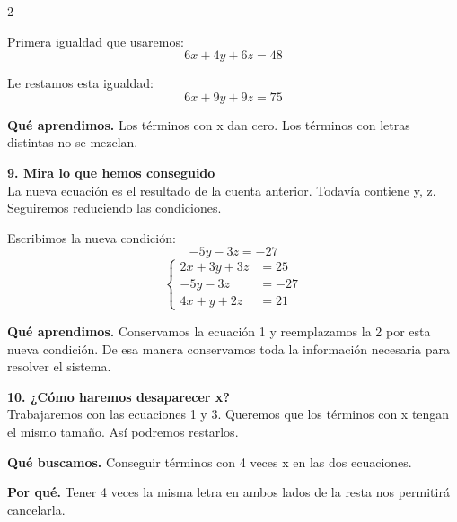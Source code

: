 \documentclass[11pt,a4paper,landscape]{article}
\begin{document}
\begin{multicols*}{2}
\begin{minipage}{\linewidth}
\par\smallskip Primera igualdad que usaremos:
\[6x + 4y + 6z = 48\]
\par\smallskip Le restamos esta igualdad:
\[6x + 9y + 9z = 75\]
\par\smallskip\textbf{Qué aprendimos.} Los términos con x dan cero. Los términos con letras distintas no se mezclan.
\end{minipage}\par\medskip
\noindent\begin{minipage}{\linewidth}\textbf{9. Mira lo que hemos conseguido}\\[2pt]La nueva ecuación es el resultado de la cuenta anterior. Todavía contiene y, z. Seguiremos reduciendo las condiciones.
\par\smallskip Escribimos la nueva condición:
\[-5y - 3z = -27\]
\[\left\{\begin{aligned}2x + 3y + 3z &= 25\\-5y - 3z &= -27\\4x + y + 2z &= 21\end{aligned}\right.\]
\par\smallskip\textbf{Qué aprendimos.} Conservamos la ecuación 1 y reemplazamos la 2 por esta nueva condición. De esa manera conservamos toda la información necesaria para resolver el sistema.
\end{minipage}\par\medskip
\noindent\begin{minipage}{\linewidth}\textbf{10. ¿Cómo haremos desaparecer x?}\\[2pt]Trabajaremos con las ecuaciones 1 y 3. Queremos que los términos con x tengan el mismo tamaño. Así podremos restarlos.
\par\smallskip\textbf{Qué buscamos.} Conseguir términos con 4 veces x en las dos ecuaciones.
\par\smallskip\textbf{Por qué.} Tener 4 veces la misma letra en ambos lados de la resta nos permitirá cancelarla.
\par{}\par\smallskip

\end{minipage}
\end{multicols*}
\end{document}

